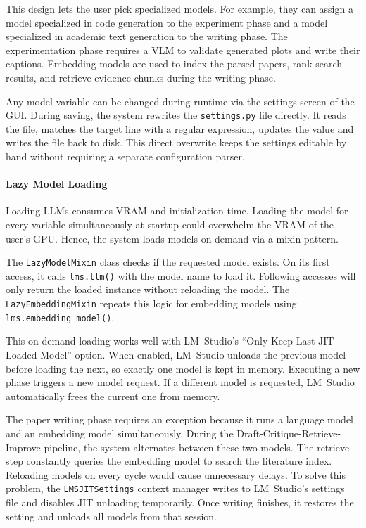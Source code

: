 This design lets the user pick specialized models.
For example, they can assign a model specialized in code generation to the experiment phase and a model specialized in academic text generation to the writing phase.
The experimentation phase requires a VLM to validate generated plots and write their captions.
Embedding models are used to index the parsed papers, rank search results, and retrieve evidence chunks during the writing phase.

Any model variable can be changed during runtime via the settings screen of the GUI.
During saving, the system rewrites the \texttt{settings.py} file directly.
It reads the file, matches the target line with a regular expression, updates the value and writes the file back to disk.
This direct overwrite keeps the settings editable by hand without requiring a separate configuration parser.

\paragraph{Lazy Model Loading}
Loading LLMs consumes VRAM and initialization time.
Loading the model for every variable simultaneously at startup could overwhelm the VRAM of the user's GPU.
Hence, the system loads models on demand via a mixin pattern.

The \texttt{LazyModelMixin} class checks if the requested model exists.
On its first access, it calls \texttt{lms.llm()} with the model name to load it.
Following accesses will only return the loaded instance without reloading the model.
The \texttt{LazyEmbeddingMixin} repeats this logic for embedding models using \texttt{lms.embedding\_model()}.

This on-demand loading works well with LM~Studio's ``Only Keep Last JIT Loaded Model'' option.
When enabled, LM~Studio unloads the previous model before loading the next, so exactly one model is kept in memory.
Executing a new phase triggers a new model request.
If a different model is requested, LM~Studio automatically frees the current one from memory.

The paper writing phase requires an exception because it runs a language model and an embedding model simultaneously.
During the Draft-Critique-Retrieve-Improve pipeline, the system alternates between these two models.
The retrieve step constantly queries the embedding model to search the literature index.
Reloading models on every cycle would cause unnecessary delays.
To solve this problem, the \texttt{LMSJITSettings} context manager writes to LM~Studio's settings file and disables JIT unloading temporarily.
Once writing finishes, it restores the setting and unloads all models from that session.

